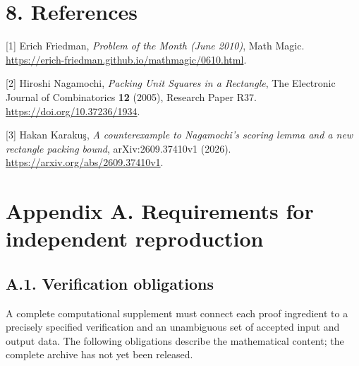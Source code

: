 \documentclass[
  11pt,
  a4paper,
]{article}
\begin{document}
\section{8. References}\label{references}

{[}1{]} Erich Friedman, \emph{Problem of the Month (June 2010)}, Math
Magic. \url{https://erich-friedman.github.io/mathmagic/0610.html}.

{[}2{]} Hiroshi Nagamochi, \emph{Packing Unit Squares in a Rectangle},
The Electronic Journal of Combinatorics \textbf{12} (2005), Research
Paper R37. \url{https://doi.org/10.37236/1934}.

{[}3{]} Hakan Karakuş, \emph{A counterexample to Nagamochi's scoring
lemma and a new rectangle packing bound}, arXiv:2609.37410v1 (2026).
\url{https://arxiv.org/abs/2609.37410v1}.

\fontsize{9.5}{10.8}\selectfont
\section{Appendix A. Requirements for independent
reproduction}\label{appendix-a.-requirements-for-independent-reproduction}

\subsection{A.1. Verification
obligations}\label{a.1.-verification-obligations}

A complete computational supplement must connect each proof ingredient
to a precisely specified verification and an unambiguous set of accepted
input and output data. The following obligations describe the
mathematical content; the complete archive has not yet been released.
\end{document}
